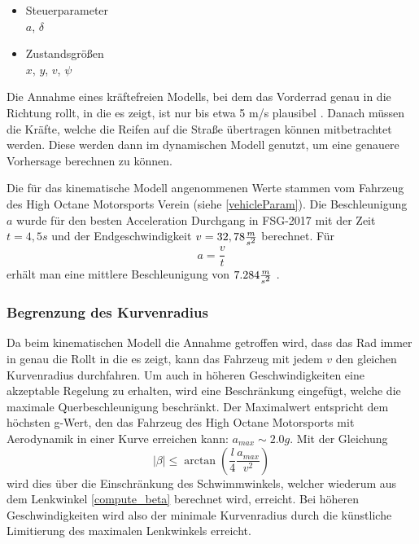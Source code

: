 \documentclass{like}
\begin{document}
\begin{itemize}
	\item Steuerparameter  \\
	\(a\), \(\delta\)
	\item Zustandsgrößen \\
	\(x\), \(y\), \(v\), \(\psi\)
	
\end{itemize}


Die Annahme eines kräftefreien Modells, bei dem das Vorderrad genau in die Richtung rollt, in die es zeigt, ist nur bis etwa 5 m/s plausibel \cite{rajamani2011vehicle}. Danach müssen die Kräfte, welche die Reifen auf die Straße übertragen können mitbetrachtet werden. Diese werden dann im dynamischen Modell genutzt, um eine genauere Vorhersage berechnen zu können.

Die für das kinematische Modell angenommenen Werte stammen vom Fahrzeug des High Octane Motorsports Verein (siehe \ref{vehicleParam}). Die Beschleunigung \(a\) wurde für den besten Acceleration Durchgang in FSG-2017 mit der Zeit $t = 4,5s$ und der Endgeschwindigkeit $v = 32,78 \frac{m}{s\textsuperscript{2}}$ berechnet. Für 
\begin{equation}
a = \frac{v}{t}  \label{long_acc_kin}
\end{equation}
erhält man eine mittlere Beschleunigung von $7.284 \frac{m}{s\textsuperscript{2}}$ .


\subsubsection*{Begrenzung des Kurvenradius}
\label{betaMax}
Da beim kinematischen Modell die Annahme getroffen wird, dass das Rad immer in genau die Rollt in die es zeigt, kann das Fahrzeug mit jedem \(v\) den gleichen Kurvenradius durchfahren. Um auch in höheren Geschwindigkeiten eine akzeptable Regelung zu erhalten, wird eine Beschränkung eingefügt, welche die maximale Querbeschleunigung beschränkt. Der Maximalwert entspricht dem höchsten g-Wert, den das Fahrzeug des High Octane Motorsports mit Aerodynamik in einer Kurve erreichen kann: $a_{max} \sim 2.0g$. 
Mit der Gleichung
\begin{equation}
	|\beta| \leq \arctan \left(\frac{l}{4} \frac{a_{max}}{v^2} \right)
\end{equation}
wird dies über die Einschränkung des Schwimmwinkels, welcher wiederum aus dem Lenkwinkel \ref{compute_beta} berechnet wird, erreicht. Bei höheren Geschwindigkeiten wird also der minimale Kurvenradius durch die künstliche Limitierung des maximalen Lenkwinkels erreicht. 
\end{document}
